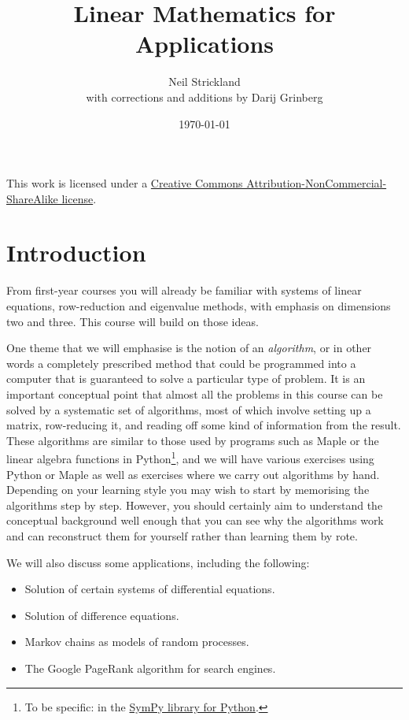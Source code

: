\documentclass[reqno]{amsart}
\theoremstyle{definition}
\begin{document}
\title{Linear Mathematics for Applications}
\author{Neil Strickland \\ with corrections and additions by Darij Grinberg}
\date{\today}

\maketitle

\begin{center}
 This work is licensed under a 
 \href{https://creativecommons.org/licenses/by-nc-sa/3.0/deed.en}{%
  Creative Commons Attribution-NonCommercial-ShareAlike license}.
 
 \bigskip

 \doclicenseImage 
\end{center}

\tableofcontents 

\section{Introduction}
\label{sec-intro}

From first-year courses you will already be familiar with systems of
linear equations, row-reduction and eigenvalue methods, with emphasis
on dimensions two and three.  This course will build on those ideas.  

One theme that we will emphasise is the notion of an \emph{algorithm},
or in other words a completely prescribed method that could be
programmed into a computer that is guaranteed to solve a particular
type of problem.  It is an important conceptual point that almost all
the problems in this course can be solved by a systematic set of
algorithms, most of which involve setting up a matrix, row-reducing
it, and reading off some kind of information from the result.  These
algorithms are similar to those used by programs such as Maple or the
linear algebra functions in Python\footnote{To be specific: in the
\href{http://sympy.org}{SymPy library for Python}.},
and we will have various exercises
using Python or Maple as well as exercises where we carry out
algorithms by hand.  Depending on your learning style you may wish to
start by memorising the algorithms step by step.  However, you should
certainly aim to understand the conceptual background well enough that
you can see why the algorithms work and can reconstruct them for
yourself rather than learning them by rote.

We will also discuss some applications, including the following:
\begin{itemize}
 \item Solution of certain systems of differential equations.
 \item Solution of difference equations.
 \item Markov chains as models of random processes.
 \item The Google PageRank algorithm for search engines.
\end{itemize}
\end{document}
